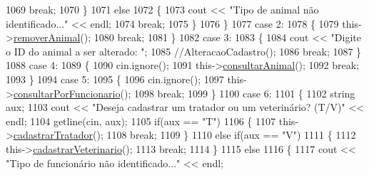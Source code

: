\begin{DoxyCode}
1069                     \textcolor{keywordflow}{break};
1070                 \}
1071                 \textcolor{keywordflow}{else}
1072                 \{
1073                     cout << \textcolor{stringliteral}{"Tipo de animal não identificado..."} << endl;
1074                     \textcolor{keywordflow}{break};
1075                 \}
1076             \}
1077             \textcolor{keywordflow}{case} 2:
1078             \{
1079                 this->\hyperlink{classPetFera_a15cf97fce272f94a4dd27bf18fed06b5}{removerAnimal}();
1080                 \textcolor{keywordflow}{break};
1081             \}
1082             \textcolor{keywordflow}{case} 3:
1083             \{
1084                 cout << \textcolor{stringliteral}{"Digite o ID do animal a ser alterado: "};
1085                 \textcolor{comment}{//AlteracaoCadastro();}
1086                 \textcolor{keywordflow}{break};
1087             \}
1088             \textcolor{keywordflow}{case} 4:
1089             \{
1090                 cin.ignore();
1091                 this->\hyperlink{classPetFera_af8534e9ad0f23cec2766845567153923}{consultarAnimal}();
1092                 \textcolor{keywordflow}{break};
1093             \}
1094             \textcolor{keywordflow}{case} 5:
1095             \{
1096                 cin.ignore();
1097                 this->\hyperlink{classPetFera_ae6f4463c6d4e0b5ca30ced88240cb6ec}{consultarPorFuncionario}();
1098                 \textcolor{keywordflow}{break};
1099             \}
1100             \textcolor{keywordflow}{case} 6:
1101             \{
1102                 \textcolor{keywordtype}{string} aux;
1103                 cout << \textcolor{stringliteral}{"Deseja cadastrar um tratador ou um veterinário? (T/V)"} << endl;
1104                 getline(cin, aux);
1105                 \textcolor{keywordflow}{if}(aux == \textcolor{stringliteral}{"T"})
1106                 \{
1107                     this->\hyperlink{classPetFera_a3f19de637207b79b21af8668d864cea2}{cadastrarTratador}();
1108                     \textcolor{keywordflow}{break};
1109                 \}
1110                 \textcolor{keywordflow}{else} \textcolor{keywordflow}{if}(aux == \textcolor{stringliteral}{"V"})
1111                 \{
1112                     this->\hyperlink{classPetFera_ad1cf3d95ff0985a9942ae15a9c8692c3}{cadastrarVeterinario}();
1113                     \textcolor{keywordflow}{break};
1114                 \}
1115                 \textcolor{keywordflow}{else}
1116                 \{
1117                     cout << \textcolor{stringliteral}{"Tipo de funcionário não identificado..."} << endl;

\end{DoxyCode}
